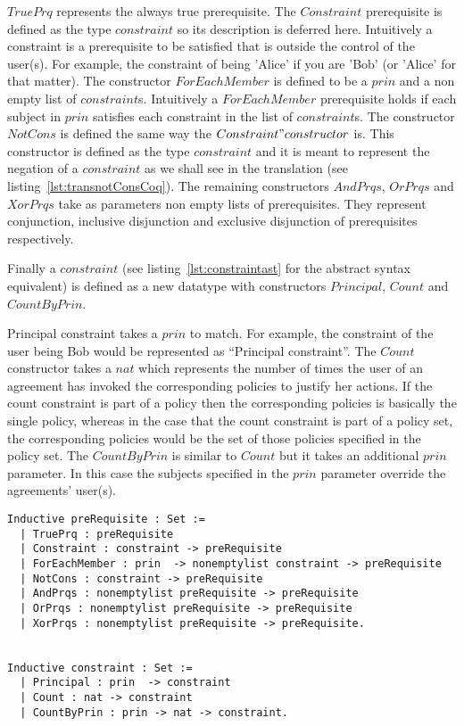 $TruePrq$ represents the always true prerequisite. The $Constraint$ prerequisite is defined as the type $constraint$ so its description is deferred here. Intuitively a constraint is a prerequisite to be satisfied that is outside the control of the user(s). For example, the constraint of being 'Alice' if you are 'Bob' (or 'Alice' for that matter). The constructor $ForEachMember$ is defined to be a $prin$ and a non empty list of $constraint$s. Intuitively a $ForEachMember$ prerequisite holds if each subject in $prin$ satisfies each constraint in the list of $constraint$s. The constructor $NotCons$ is defined the same way the $Constraint" constructor$ is. This constructor is defined as the type $constraint$ and it is meant to represent the negation of a $constraint$ as we shall see in the translation (see listing~\ref{lst:transnotConsCoq}). The remaining constructors $AndPrqs$, $OrPrqs$ and $XorPrqs$ take as parameters non empty lists of prerequisites. They represent conjunction, inclusive disjunction and exclusive disjunction of prerequisites respectively. 

Finally a $constraint$ (see  listing~\ref{lst:constraintast} for the abstract syntax equivalent) is defined as a new datatype with constructors $Principal$, $Count$ and $CountByPrin$. 

Principal constraint takes a $prin$ to match. For example, the constraint of the user being Bob would be represented as ``Principal constraint''. The $Count$ constructor takes a $nat$ which represents the number of times the user of an agreement has invoked the corresponding policies to justify her actions. If the count constraint is part of a policy then the corresponding policies is basically the single policy, whereas in the case that the count constraint is part of a policy set, the corresponding policies would be the set of those policies specified in the policy set. The $CountByPrin$ is similar to $Count$ but it takes an additional $prin$ parameter. In this case the subjects specified in the $prin$ parameter override the agreements' user(s).   

\lstset{language=Coq}
\begin{minipage}[c]{0.95\textwidth}
\begin{lstlisting}[frame=single, caption={preRequisite},label={lst:preRequisitecoq}]
Inductive preRequisite : Set :=
  | TruePrq : preRequisite
  | Constraint : constraint -> preRequisite 
  | ForEachMember : prin  -> nonemptylist constraint -> preRequisite
  | NotCons : constraint -> preRequisite 
  | AndPrqs : nonemptylist preRequisite -> preRequisite
  | OrPrqs : nonemptylist preRequisite -> preRequisite
  | XorPrqs : nonemptylist preRequisite -> preRequisite.
  
  
Inductive constraint : Set :=
  | Principal : prin  -> constraint 
  | Count : nat -> constraint 
  | CountByPrin : prin -> nat -> constraint.

\end{lstlisting}
\end{minipage}

